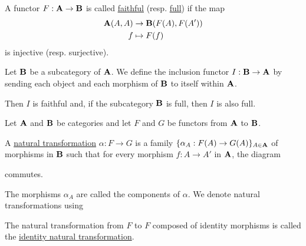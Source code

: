 \begin{definition}\label{def:faithful_full_functor}\cite[definition 1.2.16]{Leinster2014}
  A functor $F: \operatorname{\mathbf{A}} \to \operatorname{\mathbf{B}}$ is called \ul{faithful} (resp. \ul{full}) if the map
  \begin{align*}
    \operatorname{\mathbf{A}}(A, A) &\to \operatorname{\mathbf{B}}(F(A), F(A')) \\
    f &\mapsto F(f)
  \end{align*}
  is injective (resp. surjective).
\end{definition}

\begin{example}\label{def:subcategory_functors}\cite[25]{Leinster2014}
  Let $\operatorname{\mathbf{B}}$ be a subcategory of $\operatorname{\mathbf{A}}$. We define the inclusion functor $I: \operatorname{\mathbf{B}} \to \operatorname{\mathbf{A}}$ by sending each object and each morphism of $\operatorname{\mathbf{B}}$ to itself within $\operatorname{\mathbf{A}}$.

  Then $I$ is faithful and, if the subcategory $\operatorname{\mathbf{B}}$ is full, then $I$ is also full.
\end{example}

\begin{definition}\label{def:natural_transformation}\cite[definition 1.3.1]{Leinster2014}
  Let $\operatorname{\mathbf{A}}$ and $\operatorname{\mathbf{B}}$ be categories and let $F$ and $G$ be functors from $\operatorname{\mathbf{A}}$ to $\operatorname{\mathbf{B}}$.

  A \ul{natural transformation} $\alpha: F \to G$ is a family $\{ \alpha_A: F(A) \to G(A) \}_{A \in \operatorname{\mathbf{A}}}$ of morphisms in $\operatorname{\mathbf{B}}$ such that for every morphism $f: A \to A'$ in $\operatorname{\mathbf{A}}$, the diagram
  \begin{Center}
  \end{Center}
  commutes.

  The morphisms $\alpha_A$ are called the components of $\alpha$. We denote natural transformations using
  \begin{Center}
  \end{Center}

  The natural transformation from $F$ to $F$ composed of identity morphisms is called the \ul{identity natural transformation}.
\end{definition}

